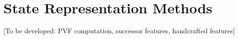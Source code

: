 \chapter{State Representation Methods}
\label{chap:representation}

[To be developed: PVF computation, successor features, handcrafted features]